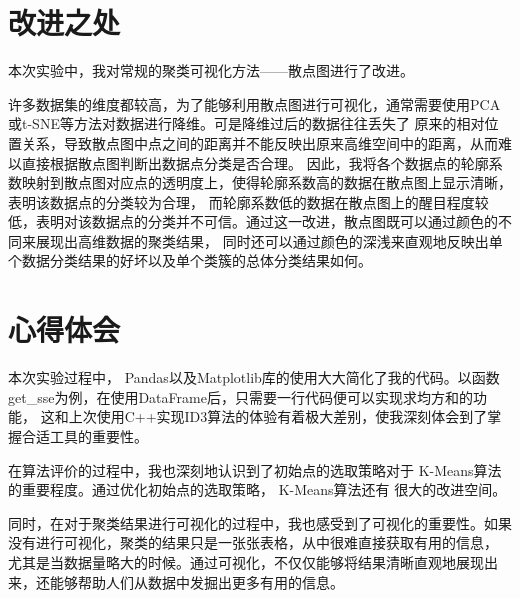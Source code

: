 \documentclass[a4paper,11pt]{article}%
\theoremstyle{remark}
\theoremstyle{remark}
\theoremstyle{definition}
\theoremstyle{definition}
\theoremstyle{definition}
\begin{document}
\section{改进之处}
本次实验中，我对常规的聚类可视化方法——散点图进行了改进。

许多数据集的维度都较高，为了能够利用散点图进行可视化，通常需要使用PCA或t-SNE等方法对数据进行降维。可是降维过后的数据往往丢失了
原来的相对位置关系，导致散点图中点之间的距离并不能反映出原来高维空间中的距离，从而难以直接根据散点图判断出数据点分类是否合理。
因此，我将各个数据点的轮廓系数映射到散点图对应点的透明度上，使得轮廓系数高的数据在散点图上显示清晰，表明该数据点的分类较为合理，
而轮廓系数低的数据在散点图上的醒目程度较低，表明对该数据点的分类并不可信。通过这一改进，散点图既可以通过颜色的不同来展现出高维数据的聚类结果，
同时还可以通过颜色的深浅来直观地反映出单个数据分类结果的好坏以及单个类簇的总体分类结果如何。
\section{心得体会}
本次实验过程中， Pandas以及Matplotlib库的使用大大简化了我的代码。以函数get\_sse为例，在使用DataFrame后，只需要一行代码便可以实现求均方和的功能，
这和上次使用C++实现ID3算法的体验有着极大差别，使我深刻体会到了掌握合适工具的重要性。

在算法评价的过程中，我也深刻地认识到了初始点的选取策略对于 K-Means算法的重要程度。通过优化初始点的选取策略， K-Means算法还有
很大的改进空间。

同时，在对于聚类结果进行可视化的过程中，我也感受到了可视化的重要性。如果没有进行可视化，聚类的结果只是一张张表格，从中很难直接获取有用的信息，
尤其是当数据量略大的时候。通过可视化，不仅仅能够将结果清晰直观地展现出来，还能够帮助人们从数据中发掘出更多有用的信息。
\end{document}
